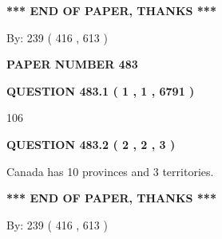 \documentclass[12pt]{article}
\begin{document}
   
   
\vspace{1.0in} 
{\textbf{\large{ *** END OF PAPER, THANKS *** }}} 
   
   
\hspace{1.0in} By: 
 239 ( 416 ,  613 )
   
   
   
   
\newpage 
\setcounter{page}{ 
   483001 } 
   
   
   
   
 {\textbf{ \Large{ PAPER NUMBER  483  }}}
   
   
\vspace{0.2in}
   
   
   
   
   
   
 \vspace{0.2in}
 
 
 
 
   
   
  
\vspace{0.2in}
  
{\textbf{\Large{QUESTION
483.1 
 ( 1 , 1 , 6791 )
}}}
  
  
 
 
\noindent{}

106
 
 
  
\vspace{0.2in}
  
{\textbf{\Large{QUESTION
483.2 
 ( 2 , 2 , 3 )
}}}
  
  
 
 
\noindent{}
 
 
Canada has 10  provinces and 3 territories.
 
 
 
 
   
   
 \vspace{0.2in}
 
   
   
   
   
\vspace{1.0in} 
{\textbf{\large{ *** END OF PAPER, THANKS *** }}} 
   
   
\hspace{1.0in} By: 
 239 ( 416 ,  613 )
   
\end{document}
